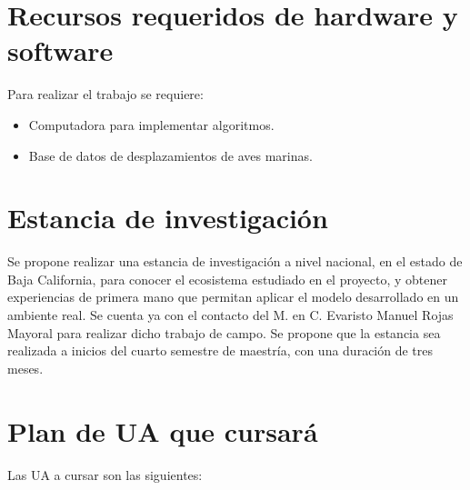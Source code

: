 \documentclass[runningheads,a4paper]{llncs}
\begin{document}
\section{Recursos requeridos de hardware y software}

Para realizar el trabajo se requiere:

\begin{itemize}
    \item Computadora para implementar algoritmos.
    \item Base de datos de desplazamientos de aves marinas.
\end{itemize}

\section{Estancia de investigación}

Se propone realizar una estancia de investigación a nivel nacional, en el estado
de Baja California, para conocer el ecosistema estudiado en el proyecto, y
obtener experiencias de primera mano que permitan aplicar el modelo desarrollado
en un ambiente real. Se cuenta ya con el contacto del M. en C. Evaristo Manuel
Rojas Mayoral para realizar dicho trabajo de campo. Se propone que la estancia
sea realizada a inicios del cuarto semestre de maestría, con una duración de
tres meses.

\section{Plan de UA que cursará}

Las UA a cursar son las siguientes:
\end{document}
